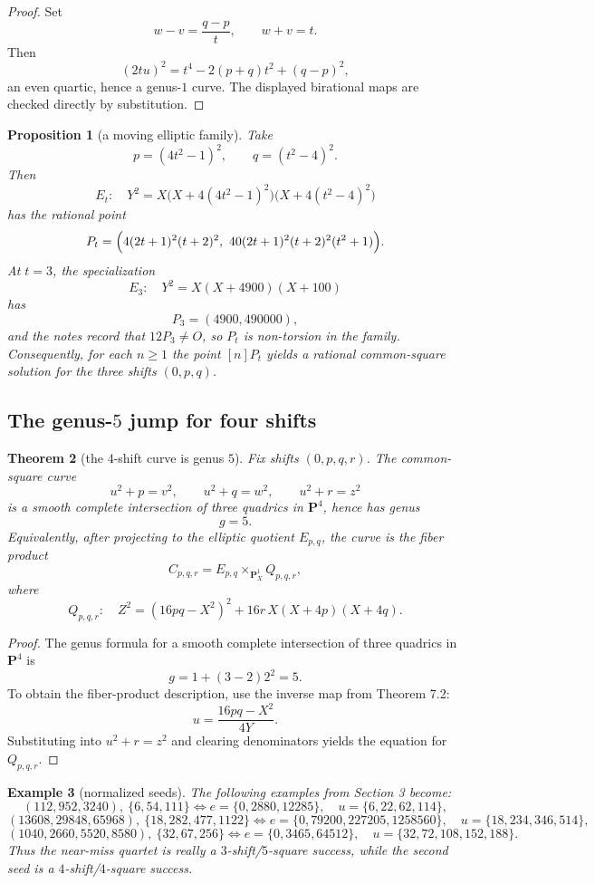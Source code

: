 \documentclass[11pt]{article}
\theoremstyle{plainbreak}
\newtheorem{theorem}{Theorem}[section]
\newtheorem{proposition}[theorem]{Proposition}
\theoremstyle{defbreak}
\newtheorem{example}[theorem]{Example}
\newcommand{\PP}{\mathbf{P}}
\begin{document}
\begin{proof}
Set
\[
w-v=\frac{q-p}{t},\qquad w+v=t.
\]
Then
\[
(2tu)^2=t^4-2(p+q)t^2+(q-p)^2,
\]
an even quartic, hence a genus-$1$ curve.  The displayed birational maps are checked directly by substitution.
\end{proof}

\begin{proposition}[a moving elliptic family]
Take
\[
p=(4t^2-1)^2,\qquad q=(t^2-4)^2.
\]
Then
\[
E_t:\quad Y^2=X\bigl(X+4(4t^2-1)^2\bigr)\bigl(X+4(t^2-4)^2\bigr)
\]
has the rational point
\[
P_t=\Bigl(4(2t+1)^2(t+2)^2,\ 40(2t+1)^2(t+2)^2(t^2+1)\Bigr).
\]
At $t=3$, the specialization
\[
E_3:\quad Y^2=X(X+4900)(X+100)
\]
has
\[
P_3=(4900,490000),
\]
and the notes record that $12P_3\ne O$, so $P_t$ is non-torsion in the family.  Consequently, for each $n\ge 1$ the point $[n]P_t$ yields a rational common-square solution for the three shifts $(0,p,q)$.
\end{proposition}

\subsection{The genus-$5$ jump for four shifts}

\begin{theorem}[the $4$-shift curve is genus $5$]
Fix shifts $(0,p,q,r)$. The common-square curve
\[
u^2+p=v^2,\qquad u^2+q=w^2,\qquad u^2+r=z^2
\]
is a smooth complete intersection of three quadrics in $\PP^4$, hence has genus
\[
g=5.
\]
Equivalently, after projecting to the elliptic quotient $E_{p,q}$, the curve is the fiber product
\[
C_{p,q,r}=E_{p,q}\times_{\PP^1_X} Q_{p,q,r},
\]
where
\[
Q_{p,q,r}:\quad Z^2=(16pq-X^2)^2+16r\,X(X+4p)(X+4q).
\]
\end{theorem}

\begin{proof}
The genus formula for a smooth complete intersection of three quadrics in $\PP^4$ is
\[
g=1+(3-2)2^2=5.
\]
To obtain the fiber-product description, use the inverse map from Theorem 7.2:
\[
u=\frac{16pq-X^2}{4Y}.
\]
Substituting into $u^2+r=z^2$ and clearing denominators yields the equation for $Q_{p,q,r}$.
\end{proof}

\begin{example}[normalized seeds]
The following examples from Section 3 become:
\[
(112,952,3240),\ \{6,54,111\}
\Longleftrightarrow
e=\{0,2880,12285\},\quad u=\{6,22,62,114\},
\]
\[
(13608,29848,65968),\ \{18,282,477,1122\}
\Longleftrightarrow
e=\{0,79200,227205,1258560\},\quad u=\{18,234,346,514\},
\]
\[
(1040,2660,5520,8580),\ \{32,67,256\}
\Longleftrightarrow
e=\{0,3465,64512\},\quad u=\{32,72,108,152,188\}.
\]
Thus the near-miss quartet is really a $3$-shift/$5$-square success, while the second seed is a $4$-shift/$4$-square success.
\end{example}
\end{document}
